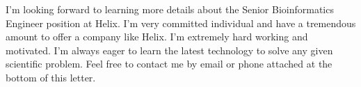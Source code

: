 \documentclass[11pt,a4paper,sans]{moderncv}        %
\begin{document}
\vspace{0.1in}
I'm looking forward to learning more details about the Senior Bioinformatics Engineer position at Helix. I'm very committed individual and have a tremendous amount
 to offer a company like Helix. I'm extremely hard working and motivated. I'm always eager to learn the latest technology to solve any given scientific problem. 
Feel free to contact me by email or phone attached at the bottom of this letter. 

\makeletterclosing
\end{document}
